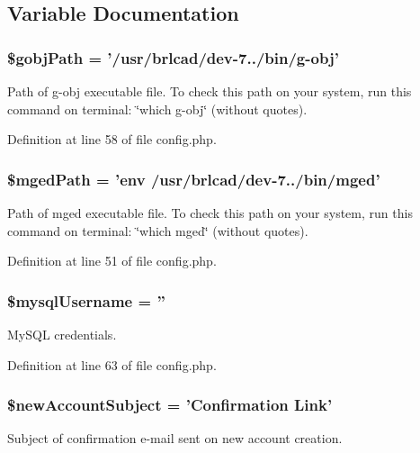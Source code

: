 \subsection{Variable Documentation}
\hypertarget{config_8php_ad0b8e5e5771eb951767f92eae6b5fd61}{
\subsubsection[{\$gobj\-Path}]{\setlength{\rightskip}{0pt plus 5cm}\$gobj\-Path = '/usr/brlcad/dev-\/7../bin/g-\/obj'}}\label{config_8php_ad0b8e5e5771eb951767f92eae6b5fd61}
Path of g-\/obj executable file. To check this path on your system, run this command on terminal\-: \char`\"{}which g-\/obj\char`\"{} (without quotes). 

Definition at line 58 of file config.\-php.

\hypertarget{config_8php_a96892bc6f442b40d6430fa776efc874c}{
\subsubsection[{\$mged\-Path}]{\setlength{\rightskip}{0pt plus 5cm}\$mged\-Path = 'env /usr/brlcad/dev-\/7../bin/mged'}}\label{config_8php_a96892bc6f442b40d6430fa776efc874c}
Path of mged executable file. To check this path on your system, run this command on terminal\-: \char`\"{}which mged\char`\"{} (without quotes). 

Definition at line 51 of file config.\-php.

\hypertarget{config_8php_a568794d7d473378056ef7746cfdffa67}{
\subsubsection[{\$mysql\-Username}]{\setlength{\rightskip}{0pt plus 5cm}\$mysql\-Username = ''}}\label{config_8php_a568794d7d473378056ef7746cfdffa67}
My\-S\-Q\-L credentials. 

Definition at line 63 of file config.\-php.

\hypertarget{config_8php_ab3f15af8055eef62be11f3a794841a07}{
\subsubsection[{\$new\-Account\-Subject}]{\setlength{\rightskip}{0pt plus 5cm}\$new\-Account\-Subject = 'Confirmation Link'}}\label{config_8php_ab3f15af8055eef62be11f3a794841a07}
Subject of confirmation e-\/mail sent on new account creation. 

